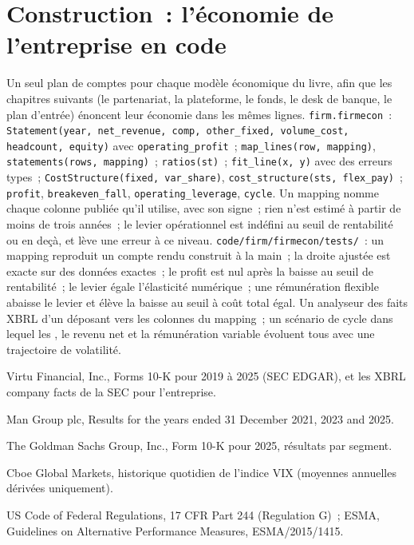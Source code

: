 \section{Construction~: l'économie de l'entreprise en code}\label{bld:fm:the-economics-of-a-trading-firm:firmecon}

\begin{build}
 Un seul plan de comptes pour chaque modèle économique du livre, afin que les chapitres suivants (le partenariat, la plateforme, le fonds, le
desk de banque, le plan d'entrée) énoncent leur économie dans les mêmes lignes.
 \texttt{firm.firmecon}~: \texttt{Statement(year, net\_revenue, comp, other\_fixed, volume\_cost, headcount, equity)} avec
\texttt{operating\_profit}~; \texttt{map\_lines(row, mapping)}, \texttt{statements(rows, mapping)}~; \texttt{ratios(st)}~; \texttt{fit\_line(x, y)}
avec des erreurs types~; \texttt{CostStructure(fixed, var\_share)}, \texttt{cost\_structure(sts, flex\_pay)}~; \texttt{profit},
\texttt{breakeven\_fall}, \texttt{operating\_leverage}, \texttt{cycle}.
 Un mapping nomme chaque colonne publiée qu'il utilise, avec son signe~; rien n'est estimé à partir de moins de trois années~; le levier opérationnel est
indéfini au seuil de rentabilité ou en deçà, et lève une erreur à ce niveau.
 \texttt{code/firm/firmecon/tests/}~: un mapping reproduit un compte rendu construit à la main~; la droite ajustée est exacte sur des données exactes~;
le profit est nul après la baisse au seuil de rentabilité~; le levier égale l'élasticité numérique~; une rémunération flexible abaisse le levier et élève la baisse au seuil
à coût total égal.
 Un analyseur des faits XBRL d'un déposant vers les colonnes du mapping~; un scénario de cycle dans lequel les , le revenu net et la
rémunération variable évoluent tous avec une trajectoire de volatilité.
\end{build}

\begin{omsources}
\item Virtu Financial, Inc., Forms 10-K pour 2019 à 2025 (SEC EDGAR), et les XBRL company facts de la SEC pour l'entreprise.
\item Man Group plc, Results for the years ended 31 December 2021, 2023 and 2025.
\item The Goldman Sachs Group, Inc., Form 10-K pour 2025, résultats par segment.
\item Cboe Global Markets, historique quotidien de l'indice VIX (moyennes annuelles dérivées uniquement).
\item US Code of Federal Regulations, 17 CFR Part 244 (Regulation G)~; ESMA, Guidelines on Alternative Performance Measures, ESMA/2015/1415.
\end{omsources}


